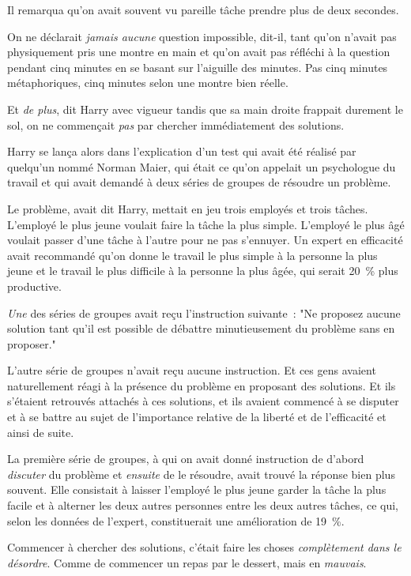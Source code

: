 Il remarqua qu'on avait souvent vu pareille tâche prendre plus de deux secondes.

On ne déclarait \emph{jamais aucune} question impossible, dit-il, tant qu'on n'avait pas physiquement pris une montre en main et qu'on avait pas réfléchi à la question pendant cinq minutes en se basant sur l'aiguille des minutes. Pas cinq minutes métaphoriques, cinq minutes selon une montre bien réelle.

Et \emph{de plus}, dit Harry avec vigueur tandis que sa main droite frappait durement le sol, on ne commençait \emph{pas} par chercher immédiatement des solutions.

Harry se lança alors dans l'explication d'un test qui avait été réalisé par quelqu'un nommé Norman Maier, qui était ce qu'on appelait un psychologue du travail et qui avait demandé à deux séries de groupes de résoudre un problème.

Le problème, avait dit Harry, mettait en jeu trois employés et trois tâches. L'employé le plus jeune voulait faire la tâche la plus simple. L'employé le plus âgé voulait passer d'une tâche à l'autre pour ne pas s'ennuyer. Un expert en efficacité avait recommandé qu'on donne le travail le plus simple à la personne la plus jeune et le travail le plus difficile à la personne la plus âgée, qui serait 20~\% plus productive.

\emph{Une} des séries de groupes avait reçu l'instruction suivante~: "Ne proposez aucune solution tant qu'il est possible de débattre minutieusement du problème sans en proposer."

L'autre série de groupes n'avait reçu aucune instruction. Et ces gens avaient naturellement réagi à la présence du problème en proposant des solutions. Et ils s'étaient retrouvés attachés à ces solutions, et ils avaient commencé à se disputer et à se battre au sujet de l'importance relative de la liberté et de l'efficacité et ainsi de suite.

La première série de groupes, à qui on avait donné instruction de d'abord \emph{discuter} du problème et \emph{ensuite} de le résoudre, avait trouvé la réponse bien plus souvent. Elle consistait à laisser l'employé le plus jeune garder la tâche la plus facile et à alterner les deux autres personnes entre les deux autres tâches, ce qui, selon les données de l'expert, constituerait une amélioration de 19~\%.

Commencer à chercher des solutions, c'était faire les choses \emph{complètement dans le désordre}. Comme de commencer un repas par le dessert, mais en \emph{mauvais}.

